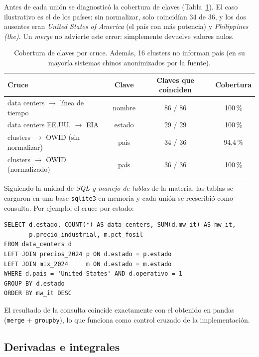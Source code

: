\documentclass[11pt,a4paper]{article}
\begin{document}
Antes de cada unión se diagnosticó la cobertura de claves (Tabla~\ref{tab:cobertura}). El caso ilustrativo es el de los países: sin normalizar, solo coincidían 34 de 36, y los dos ausentes eran \emph{United States of America} (el país con más potencia) y \emph{Philippines (the)}. Un \emph{merge} no advierte este error: simplemente devuelve valores nulos.

\begin{table}[h]
\centering\small
\begin{tabular}{@{}lccc@{}}
\toprule
\textbf{Cruce} & \textbf{Clave} & \textbf{Claves que coinciden} & \textbf{Cobertura} \\
\midrule
data centers $\to$ línea de tiempo & nombre & 86 / 86 & 100\,\% \\
data centers EE.UU. $\to$ EIA & estado & 29 / 29 & 100\,\% \\
clusters $\to$ OWID (sin normalizar) & país & 34 / 36 & 94,4\,\% \\
clusters $\to$ OWID (normalizado) & país & 36 / 36 & 100\,\% \\
\bottomrule
\end{tabular}
\caption{Cobertura de claves por cruce. Además, 16 clusters no informan país (en su mayoría sistemas chinos anonimizados por la fuente).}
\label{tab:cobertura}
\end{table}

Siguiendo la unidad de \emph{SQL y manejo de tablas} de la materia, las tablas se cargaron en una base \texttt{sqlite3} en memoria y cada unión se reescribió como consulta. Por ejemplo, el cruce por estado:

\noindent\begin{minipage}{\linewidth}
\begin{lstlisting}
SELECT d.estado, COUNT(*) AS data_centers, SUM(d.mw_it) AS mw_it,
       p.precio_industrial, m.pct_fosil
FROM data_centers d
LEFT JOIN precios_2024 p ON d.estado = p.estado
LEFT JOIN mix_2024     m ON d.estado = m.estado
WHERE d.pais = 'United States' AND d.operativo = 1
GROUP BY d.estado
ORDER BY mw_it DESC
\end{lstlisting}
\end{minipage}

El resultado de la consulta coincide exactamente con el obtenido en pandas (\texttt{merge} + \texttt{groupby}), lo que funciona como control cruzado de la implementación.

\subsection{Derivadas e integrales}
\end{document}

